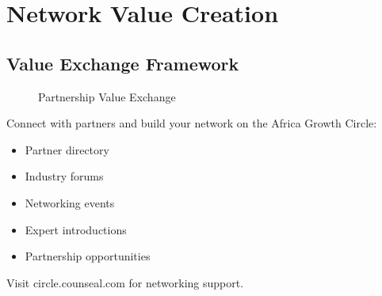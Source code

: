 \FloatBarrier
\section{Network Value Creation}

\subsection{Value Exchange Framework}
\begin{figure}[htbp]
    \centering
    \caption{Partnership Value Exchange}
    \label{fig:value-exchange}
\end{figure}

\begin{communitybox}
Connect with partners and build your network on the Africa Growth Circle:
\begin{itemize}
    \item Partner directory
    \item Industry forums
    \item Networking events
    \item Expert introductions
    \item Partnership opportunities
\end{itemize}
Visit circle.counseal.com for networking support.
\end{communitybox}

